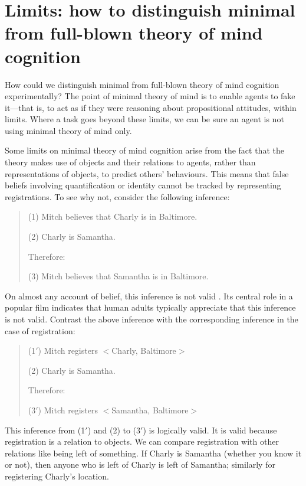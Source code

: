 \documentclass[12pt,\papersize]{extarticle}
\begin{document}
\section{Limits: how to distinguish minimal from full-blown theory of mind cognition}
\label{sec:limits1}
How could we distinguish minimal from full-blown theory of mind cognition experimentally?  The point of minimal theory of mind is to enable agents to fake it—that is, to act as if they were reasoning about propositional attitudes, within limits.  Where a task goes beyond these limits, we can be sure an agent is not using minimal theory of mind only.

Some limits on minimal theory of mind cognition arise from the fact that the theory makes use of objects and their relations to agents, rather than representations of objects, to predict others’ behaviours.  This means that false beliefs involving quantification or identity cannot be tracked by representing registrations.  To see why not, consider the following inference:
%
\begin{quote}
(1) Mitch believes that Charly is in Baltimore.

(2) Charly is Samantha.

Therefore:

(3) Mitch believes that Samantha is in Baltimore.
\end{quote}
%
On almost any account of belief, this inference is not valid
\citep[][pp.\ 214-5]{frege:1948_sense}.  Its central role in a popular film \citep[]{en_1793} indicates that human adults typically appreciate that this inference is not valid.  Contrast the above inference with the corresponding inference in the case of registration:
%
\begin{quote}
(1$'$) Mitch registers \(<\)Charly, Baltimore\(>\)

(2) Charly is Samantha.

Therefore:

(3$'$) Mitch registers \(<\)Samantha, Baltimore\(>\)
\end{quote}
%
This inference from (1$'$) and (2) to (3$'$) is logically valid.  It is valid because registration is a relation to objects.  We can compare registration with other relations like being left of something.  If Charly is Samantha (whether you know it or not), then anyone who is left of Charly is left of Samantha; similarly for registering Charly’s location. 
\end{document}

